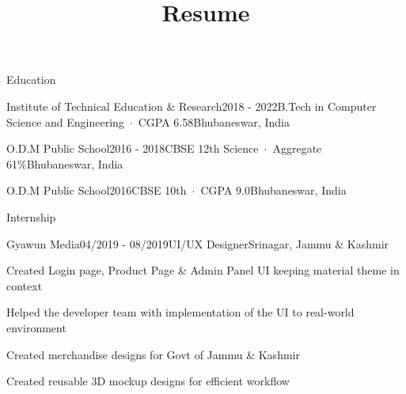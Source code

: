 \documentclass{resume} %
\begin{document}
\title{Resume}


\begin{rSection}{Education}
\begin{rSubsection}{Institute of Technical Education \& Research}{2018 - 2022}{B.Tech in Computer Science and Engineering~$\cdot$~CGPA 6.58}{Bhubaneswar, India}
\vspace{-.65cm}
\item[]
\end{rSubsection}
\begin{rSubsection}{O.D.M Public School}{2016 - 2018}{CBSE 12th Science~$\cdot$~Aggregate 61\%}{Bhubaneswar, India}
\end{rSubsection}
\begin{rSubsection}{O.D.M Public School}{2016}{CBSE 10th~$\cdot$~CGPA 9.0}{Bhubaneswar, India}

\end{rSubsection}
\end{rSection}



\begin{rSection}{Internship}
\begin{rSubsection}{Gyawun Media}{04/2019 - 08/2019}{UI/UX Designer}{Srinagar, Jammu \& Kashmir}

\item Created Login page, Product Page \& Admin Panel UI keeping material theme in context
\item Helped the developer team with implementation of the UI to real-world environment
\item Created merchandise designs for Govt of Jammu \& Kashmir
\item Created reusable 3D mockup designs for efficient workflow

\end{rSubsection}
\end{rSection}
\end{document}
